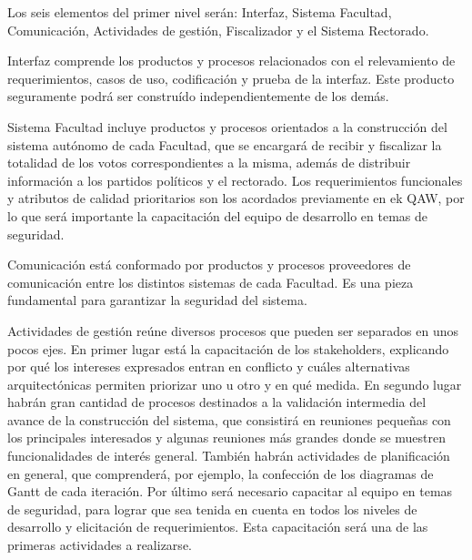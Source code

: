 Los seis elementos del primer nivel serán: Interfaz, Sistema Facultad, Comunicación, Actividades de gestión, Fiscalizador y el Sistema Rectorado.
\\ \par
Interfaz comprende los productos y procesos relacionados con el relevamiento de requerimientos, casos de uso, codificación y prueba de la interfaz. Este producto seguramente podrá ser construído independientemente de los demás.
\\ \par
Sistema Facultad incluye productos y procesos orientados a la construcción del sistema autónomo de cada Facultad, que se encargará de recibir y fiscalizar la totalidad de los votos correspondientes a la misma, además de distribuir información a los partidos políticos y el rectorado. Los requerimientos funcionales y atributos de calidad prioritarios son los acordados previamente en ek QAW, por lo que será importante la capacitación del equipo de desarrollo en temas de seguridad.
\\ \par
Comunicación está conformado por productos y procesos proveedores de comunicación entre los distintos sistemas de cada Facultad. Es una pieza fundamental para garantizar la seguridad del sistema. 
\\ \par
Actividades de gestión reúne diversos procesos que pueden ser separados en unos pocos ejes. En primer lugar está la capacitación de los stakeholders, explicando por qué los intereses expresados entran en conflicto y cuáles alternativas arquitectónicas permiten priorizar uno u otro y en qué medida.
En segundo lugar habrán gran cantidad de procesos destinados a la validación intermedia del avance de la construcción del sistema, que consistirá en reuniones pequeñas con los principales interesados y algunas reuniones más grandes donde se muestren funcionalidades de interés general.
También habrán actividades de planificación en general, que comprenderá, por ejemplo, la confección de los diagramas de Gantt de cada iteración.
Por último será necesario capacitar al equipo en temas de seguridad, para lograr que sea tenida en cuenta en todos los niveles de desarrollo y elicitación de requerimientos. Esta capacitación será una de las primeras actividades a realizarse.
\\ \par
